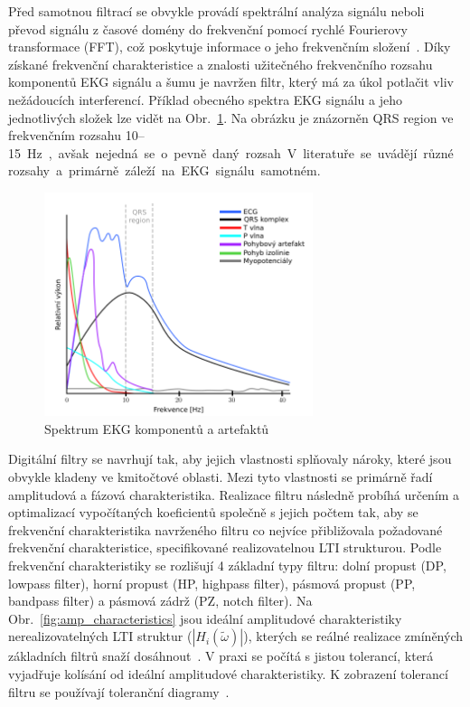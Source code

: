 Před samotnou filtrací se obvykle provádí spektrální analýza signálu neboli
převod signálu z časové domény do frekvenční pomocí rychlé Fourierovy transformace
(FFT), což poskytuje informace o jeho frekvenčním složení~\cite{Prchal2000}.
Díky získané frekvenční charakteristice a znalosti užitečného frekvenčního
rozsahu komponentů EKG signálu a šumu je navržen filtr, který má za úkol
potlačit vliv nežádoucích interferencí. Příklad obecného spektra EKG signálu a
jeho jednotlivých složek lze vidět na Obr.~\ref{fig:ecg_spectrum}. Na obrázku je
znázorněn QRS region ve frekvenčním rozsahu 10--15~\si\Hz,~avšak nejedná se o
pevně daný rozsah. V literatuře se uvádějí různé rozsahy a primárně záleží na
EKG signálu samotném.

\begin{figure}[h]
	\begin{center}
		\includegraphics[width=0.7\textwidth]{../assets/figures/ecg_spectrum}
		\caption{Spektrum EKG komponentů a artefaktů}
		\label{fig:ecg_spectrum}
	\end{center}
\end{figure}

Digitální filtry se navrhují tak, aby jejich vlastnosti splňovaly nároky, které
jsou obvykle kladeny ve kmitočtové oblasti. Mezi tyto vlastnosti se primárně
řadí amplitudová a fázová charakteristika. Realizace filtru následně probíhá
určením a optimalizací vypočítaných koeficientů společně s jejich počtem tak,
aby se frekvenční charakteristika navrženého filtru co nejvíce přibližovala
požadované frekvenční charakteristice, specifikované realizovatelnou LTI
strukturou. Podle frekvenční charakteristiky se rozlišují 4 základní typy
filtru: dolní propust (DP, lowpass filter), horní propust (HP, highpass filter),
pásmová propust (PP, bandpass filter) a pásmová zádrž (PZ, notch filter). Na
Obr.~\ref{fig:amp_characteristics} jsou ideální amplitudové charakteristiky
nerealizovatelných LTI struktur ($|H_i(\widetilde\omega)|$), kterých se reálné
realizace zmíněných základních filtrů snaží
dosáhnout~\cite{Skop1994,Prchal2000}. V praxi se počítá s jistou tolerancí,
která vyjadřuje kolísání od ideální amplitudové charakteristiky. K zobrazení
tolerancí filtru se používají toleranční diagramy~\cite{Prchal2000,Lyons1997}.

